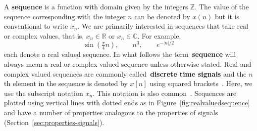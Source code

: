 \documentclass[11pt,a4paper]{book}
\theoremstyle{plain}
\numberwithin{equation}{section}
\newcommand{\reals}{{\mathbb R}}
\newcommand{\ints}{{\mathbb Z}}
\newcommand{\complex}{{\mathbb C}}
\newcommand{\term}{\textbf}
\newcommand{\sabs}[1]{\vert #1 \vert}
\begin{document}
A \term{sequence} is a function with domain given by the integers $\ints$.  The value of the sequence corresponding with the integer $n$ can be denoted by $x(n)$ but it is conventional to write $x_n$.  We are primarily interested in sequences that take real or complex values, that is, $x_n \in \reals$ or $x_n \in \complex$.  For example,
\[
\sin( \tfrac{\pi}{4} n), \qquad n^3, \qquad e^{-\sabs{n}/2}
\]
each denote a real valued sequence.  In what follows the term~\term{sequence} will always mean a real or complex valued sequence unless otherwise stated.  Real and complex valued sequences are commonly called~\term{discrete time signals} and the $n$th element in the sequence is denoted by $x[n]$ using squared brackets~\citep{Oppenheiim_sigs_sys_1996}.  Here, we use the subscript notation $x_n$. This notation is also common~\citep{vetterli_fund_sig_proc,Rudin_real_and_complex_analysis}.
Sequences are plotted using vertical lines with dotted ends as in Figure~\ref{fig:realvaluedsequence} and have a number of properties analogous to the properties of signals (Section~\ref{sec:properties-signals}).
\end{document}

